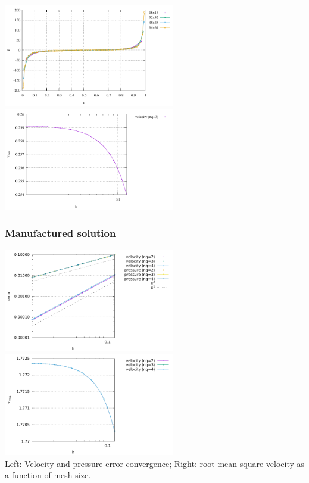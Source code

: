 \begin{center}
\includegraphics[width=7.5cm]{python_codes/fieldstone_80/results/ldc/p_top}
\includegraphics[width=7.5cm]{python_codes/fieldstone_80/results/ldc/vrms}
\end{center}


\subsubsection*{Manufactured solution}

\begin{center}
\includegraphics[width=7.5cm]{python_codes/fieldstone_80/results/lamich/errors}
\includegraphics[width=7.5cm]{python_codes/fieldstone_80/results/lamich/vrms}\\
{\captionfont Left: Velocity and pressure error convergence; Right: root mean square velocity
as a function of mesh size.}
\end{center}


